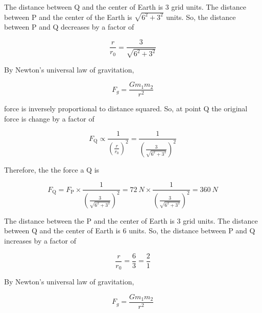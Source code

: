 \documentclass[answers]{exam}
\newif\ifversionKlevel
\begin{document}
\begin{questions}
\ifversionKlevel
    \begin{solutionorbox}[7cm]
    The distance between Q and the center of Earth is 3 grid units. The distance between P and the center of the Earth is $\sqrt{6^2 + 3^2}$ units. So, the distance between P and Q decreases by a factor of 
    
    \begin{equation*}
        \frac{r}{r_0} = \frac{3}{\sqrt{6^2 + 3^2}}
    \end{equation*}
    
    By Newton's universal law of gravitation,
    
    \begin{equation*}
        F_g = \frac{Gm_1 m_2}{r^2}
    \end{equation*}
    
    force is inversely proportional to distance squared. So, at point Q the original force is change by a factor of 
    
    \begin{equation*}
        F_\mathrm{Q} \propto \frac{1}{\left(\displaystyle \frac{r}{r_0}\right)^2} = \frac{1}{\left(\displaystyle \frac{3}{\sqrt{6^2 + 3^2}}\right)^2}
    \end{equation*}
    
    Therefore, the the force a Q is
    
    \begin{equation*}
        F_\mathrm{Q} = F_\mathrm{P} \times \frac{1}{\left(\displaystyle \frac{3}{\sqrt{6^2 + 3^2}}\right)^2} = \SI{72}{N} \times \frac{1}{\left(\displaystyle \frac{3}{\sqrt{6^2 + 3^2}}\right)^2} = \boxed{\SI{360}{N}}
    \end{equation*}
    \end{solutionorbox}
\else
    \begin{solutionorbox}[10cm]
    The distance between the P and the center of Earth is 3 grid units. The distance between Q and the center of Earth is 6 units. So, the distance between P and Q increases by a factor of 
    
    \begin{equation*}
        \frac{r}{r_0} = \frac{6}{3} = \frac{2}{1}
    \end{equation*}
    
    By Newton's universal law of gravitation,
    
    \begin{equation*}
        F_g = \frac{Gm_1 m_2}{r^2}
    \end{equation*}
    

\end{solutionorbox}
\end{questions}
\end{document}
